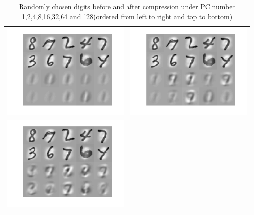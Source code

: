 \documentclass[paper=a4, fontsize=11pt]{scrartcl} %
\numberwithin{equation}{section} %
\numberwithin{figure}{section} %
\numberwithin{table}{section} %
\begin{document}
\begin{table}[H]
\caption{Randomly chosen digits before and after compression under PC number 1,2,4,8,16,32,64 and 128(ordered from left to right and top to bottom)}
\centering
\begin{tabular}{cc}
	\includegraphics[scale=.3]{image_1}&
	\includegraphics[scale=.3]{image_2}\\
	\includegraphics[scale=.3]{image_4}&

\end{tabular}
\end{table}
\end{document}
